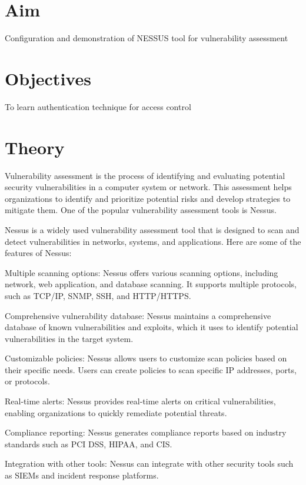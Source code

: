 \documentclass[11pt]{article}
\begin{document}
\tableofcontents
\thispagestyle{empty}
\clearpage

\setcounter{page}{1}

\section{Aim}
Configuration and demonstration of NESSUS tool for vulnerability assessment

\section{Objectives}
To learn authentication technique for access control

\section{Theory}

Vulnerability assessment is the process of identifying and evaluating potential security vulnerabilities in a computer system or network. This assessment helps organizations to identify and prioritize potential risks and develop strategies to mitigate them. One of the popular vulnerability assessment tools is Nessus.

Nessus is a widely used vulnerability assessment tool that is designed to scan and detect vulnerabilities in networks, systems, and applications. Here are some of the features of Nessus:

Multiple scanning options: Nessus offers various scanning options, including network, web application, and database scanning. It supports multiple protocols, such as TCP/IP, SNMP, SSH, and HTTP/HTTPS.

Comprehensive vulnerability database: Nessus maintains a comprehensive database of known vulnerabilities and exploits, which it uses to identify potential vulnerabilities in the target system.

Customizable policies: Nessus allows users to customize scan policies based on their specific needs. Users can create policies to scan specific IP addresses, ports, or protocols.

Real-time alerts: Nessus provides real-time alerts on critical vulnerabilities, enabling organizations to quickly remediate potential threats.

Compliance reporting: Nessus generates compliance reports based on industry standards such as PCI DSS, HIPAA, and CIS.

Integration with other tools: Nessus can integrate with other security tools such as SIEMs and incident response platforms.
\end{document}
